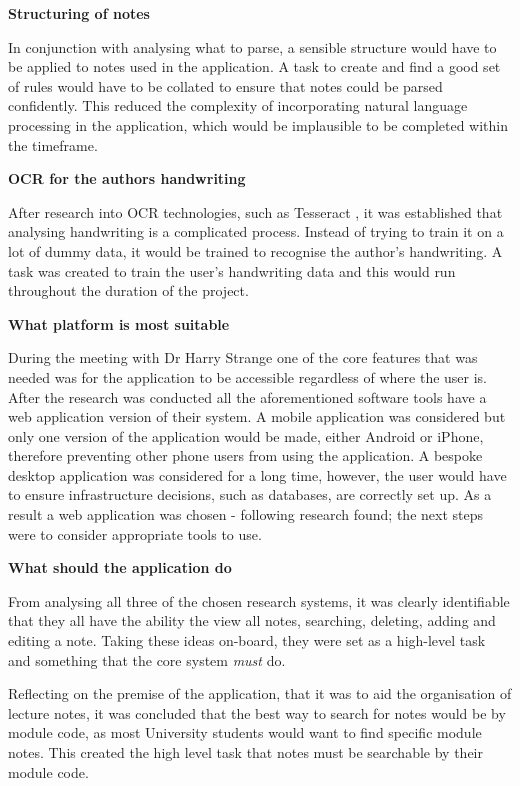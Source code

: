 \noindent
\textbf{Structuring of notes}


In conjunction with analysing what to parse, a sensible structure would have to be applied to notes used in the application. A task to create and find a good set of rules would have to be collated to ensure that notes could be parsed confidently. This reduced the complexity of incorporating natural language processing in the application, which would be implausible to be completed within the timeframe.

\noindent
\textbf{OCR for the authors handwriting}


After research into OCR technologies, such as Tesseract \cite{citeulike:14014368}, it was established that analysing handwriting is a complicated process. Instead of trying to train it on a lot of dummy data, it would be trained to recognise the author's handwriting. A task was created to train the user's handwriting data and this would run throughout the duration of the project.


\noindent
\textbf{What platform is most suitable}


During the meeting with Dr Harry Strange one of the core features that was needed was for the application to be accessible regardless of where the user is. After the research was conducted all the aforementioned software tools have a web application version of their system. A mobile application was considered but only one version of the application would be made, either Android or iPhone, therefore preventing other phone users from using the application. A bespoke desktop application was considered for a long time, however, the user would have to ensure infrastructure decisions, such as databases, are correctly set up. As a result a web application was chosen - following research found; the next steps were to consider appropriate tools to use.

\noindent
\textbf{What should the application do}


From analysing all three of the chosen research systems, it was clearly identifiable that they all have the ability the view all notes, searching, deleting, adding and editing a note. Taking these ideas on-board, they were set as a high-level task and something that the core system \textit{must} do.

Reflecting on the premise of the application, that it was to aid the organisation of lecture notes, it was concluded that the best way to search for notes would be by module code, as most University students would want to find specific module notes. This created the high level task that notes must be searchable by their module code.

